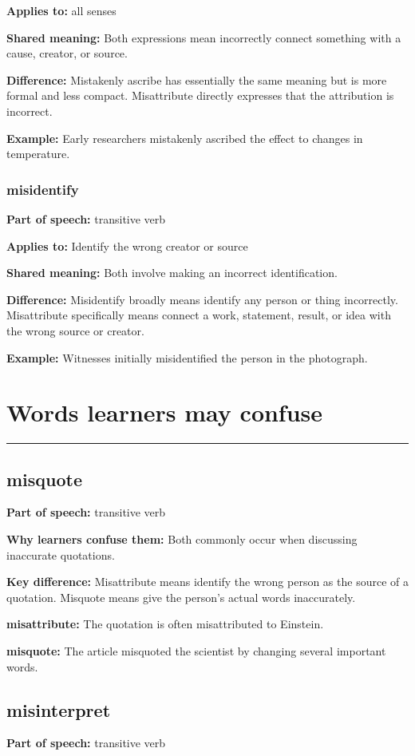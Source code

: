 \documentclass[11pt]{article}
\newcommand{\sectionrule}{\par\vspace{-0.5em}\noindent\textcolor{Accent}{\rule{\linewidth}{0.6pt}}\par}
\begin{document}
\textbf{Applies to:} all senses

\textbf{Shared meaning:} Both expressions mean incorrectly connect something with a cause, creator, or source.

\textbf{Difference:} Mistakenly ascribe has essentially the same meaning but is more formal and less compact. Misattribute directly expresses that the attribution is incorrect.

\textbf{Example:} Early researchers mistakenly ascribed the effect to changes in temperature.

\subsubsection{misidentify}
\textbf{Part of speech:} transitive verb

\textbf{Applies to:} Identify the wrong creator or source

\textbf{Shared meaning:} Both involve making an incorrect identification.

\textbf{Difference:} Misidentify broadly means identify any person or thing incorrectly. Misattribute specifically means connect a work, statement, result, or idea with the wrong source or creator.

\textbf{Example:} Witnesses initially misidentified the person in the photograph.

\section{Words learners may confuse}
\sectionrule
\subsection{misquote}
\textbf{Part of speech:} transitive verb

\textbf{Why learners confuse them:} Both commonly occur when discussing inaccurate quotations.

\textbf{Key difference:} Misattribute means identify the wrong person as the source of a quotation. Misquote means give the person's actual words inaccurately.

\textbf{misattribute:} The quotation is often misattributed to Einstein.

\textbf{misquote:} The article misquoted the scientist by changing several important words.

\subsection{misinterpret}
\textbf{Part of speech:} transitive verb
\end{document}
